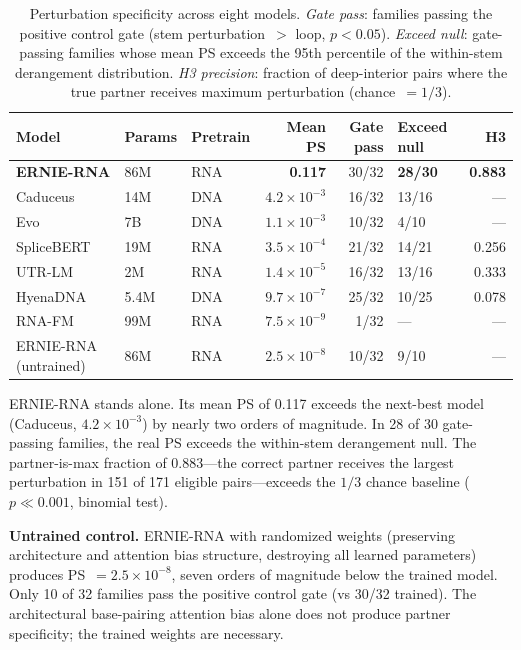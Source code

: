 \documentclass[11pt]{article}
\begin{document}
\begin{table}[ht]
\centering
\caption{Perturbation specificity across eight models.
  \emph{Gate pass}: families passing the positive control gate
  (stem perturbation~$>$ loop, $p < 0.05$).
  \emph{Exceed null}: gate-passing families whose mean PS exceeds the
  95th percentile of the within-stem derangement distribution.
  \emph{H3 precision}: fraction of deep-interior pairs where the
  true partner receives maximum perturbation (chance~$= 1/3$).}
\label{tab:phase6}
\begin{tabular}{lllrrlr}
\toprule
Model & Params & Pretrain & Mean PS & Gate pass & Exceed null & H3 \\
\midrule
\textbf{ERNIE-RNA}  & 86M  & RNA & \textbf{0.117}         & 30/32 & \textbf{28/30} & \textbf{0.883} \\
Caduceus             & 14M  & DNA & $4.2 \times 10^{-3}$   & 16/32 & 13/16          & ---            \\
Evo                  & 7B   & DNA & $1.1 \times 10^{-3}$   & 10/32 & 4/10           & ---            \\
SpliceBERT           & 19M  & RNA & $3.5 \times 10^{-4}$   & 21/32 & 14/21          & 0.256          \\
UTR-LM               & 2M   & RNA & $1.4 \times 10^{-5}$   & 16/32 & 13/16          & 0.333          \\
HyenaDNA             & 5.4M & DNA & $9.7 \times 10^{-7}$   & 25/32 & 10/25          & 0.078          \\
RNA-FM               & 99M  & RNA & $7.5 \times 10^{-9}$   & 1/32  & ---            & ---            \\
ERNIE-RNA (untrained) & 86M & RNA & $2.5 \times 10^{-8}$  & 10/32 & 9/10           & ---            \\
\bottomrule
\end{tabular}
\end{table}

ERNIE-RNA stands alone.  Its mean PS of 0.117 exceeds the next-best
model (Caduceus, $4.2 \times 10^{-3}$) by nearly two orders of
magnitude.  In 28 of 30 gate-passing families, the real PS exceeds
the within-stem derangement null.  The partner-is-max fraction of
0.883---the correct partner receives the largest perturbation in 151
of 171 eligible pairs---exceeds the $1/3$ chance baseline
($p \ll 0.001$, binomial test).

\textbf{Untrained control.}
ERNIE-RNA with randomized weights (preserving architecture and
attention bias structure, destroying all learned parameters) produces
PS~$= 2.5 \times 10^{-8}$, seven orders of magnitude below the
trained model.  Only 10 of 32 families pass the positive control gate
(vs 30/32 trained).  The architectural base-pairing attention bias
alone does not produce partner specificity; the trained weights are
necessary.
\end{document}

